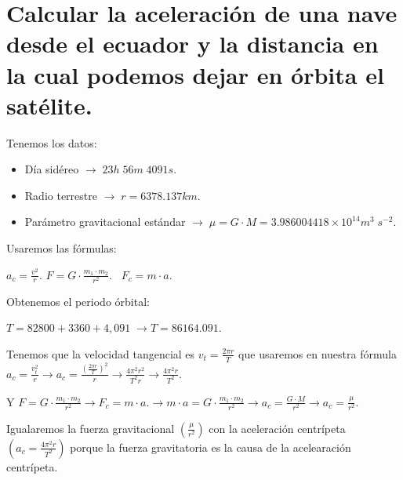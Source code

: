 \documentclass[a4paper,12pt]{article}
\begin{document}
\section{Calcular la aceleración de una nave desde el ecuador y la distancia  en la cual podemos dejar en órbita el satélite.}
\begin{justify}
    Tenemos los datos:
\end{justify}
\begin{itemize}
    \item Día sidéreo  \(\rightarrow \;23h \; 56m \; 4091s\).
    \item Radio terrestre \(\rightarrow \; r  = 6378.137 km.\)
    \item Parámetro gravitacional estándar \(\rightarrow \;\mu   = G\cdot M  = 3.986004418 \times 10^{14} m^3\;s^{-2}.\)
\end{itemize}
\vspace{\baselineskip}

\begin{justify}
    Usaremos las fórmulas:
\end{justify}

\(a_c = \frac{v^2}{r}.\) \;\;\;\;\;\;\;\;\; \(F = G \cdot \frac{m_1\cdot m_2}{r^2}.\) \;\;\,\;\;\;\;\;\; \(F_c = m \cdot a .\)

\vspace{\baselineskip}
\begin{justify}
    Obtenemos el periodo órbital:
\end{justify}
\(T = 82800 + 3360 + 4,091 \; \rightarrow T = 86164.091\).

\begin{justify}
    Tenemos que la velocidad tangencial es \(v_t = \frac{2\pi r}{T}\) que usaremos en nuestra fórmula \(a_c = \frac{v_t^2}{r} \rightarrow a_c =  \frac{(\frac{2\pi r}{T})^2}{r} \rightarrow \frac{4\pi^2 r^2}{T^2 r} \rightarrow \frac{4\pi^2 r}{T^2}.\)
\end{justify}
\begin{justify}
Y \(F = G \cdot \frac{m_1\cdot m_2}{r^2} \rightarrow F_c = m \cdot a . \rightarrow m\cdot a = G \cdot \frac{m_1\cdot m_2}{r^2} \rightarrow  a_c =  \frac{G\cdot M  }{r^2} \rightarrow a_c = \frac{\mu }{r^2}.\)
\end{justify}
\vspace{\baselineskip}
\begin{justify}
    Igualaremos la fuerza gravitacional \(\left(\frac{\mu }{r^2}\right)\) con la aceleración centrípeta \(\left(a_c = \frac{4\pi^2 r}{T^2}\right)\) porque la fuerza gravitatoria es la causa de la acelearación centrípeta.
\end{justify}
\vspace{\baselineskip}
\end{document}
